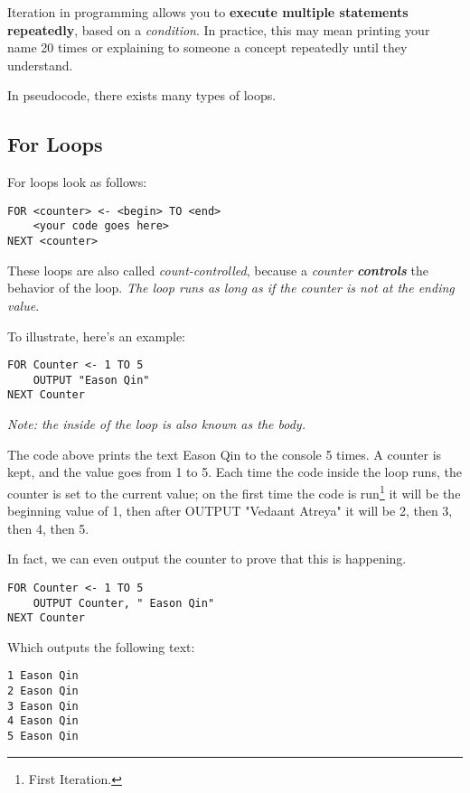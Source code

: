 \documentclass[./main.tex]{subfiles}
\begin{document}
Iteration in programming allows you to \textbf{execute multiple statements repeatedly}, based on a \emph{condition}. In practice, this may mean printing your name 20 times or explaining to someone a concept repeatedly until they understand.

In pseudocode, there exists many types of loops.

\subsection{For Loops}
\label{sec:for_loops}

For loops look as follows:

\begin{verbatim}
FOR <counter> <- <begin> TO <end>
    <your code goes here>
NEXT <counter>
\end{verbatim}

These loops are also called \emph{count-controlled}, because a \emph{counter \textbf{controls}} the behavior of the loop. \emph{The loop runs as long as if the counter is not at the ending value}.

To illustrate, here's an example:

\begin{verbatim}
FOR Counter <- 1 TO 5
    OUTPUT "Eason Qin"
NEXT Counter
\end{verbatim}

\emph{Note: the inside of the loop is also known as the body.}

The code above prints the text {\ccmono Eason Qin} to the console 5 times. A counter is kept, and the value goes from 1 to 5. Each time the code inside the loop runs, the counter is set to the current value; on the first time the code is run\footnote{First Iteration.} it will be the beginning value of 1, then after {\ccmono OUTPUT "Vedaant Atreya"} it will be 2, then 3, then 4, then 5.

In fact, we can even output the counter to prove that this is happening.

\begin{verbatim}
FOR Counter <- 1 TO 5
    OUTPUT Counter, " Eason Qin"
NEXT Counter
\end{verbatim}

Which outputs the following text:

\begin{verbatim}
1 Eason Qin
2 Eason Qin
3 Eason Qin
4 Eason Qin
5 Eason Qin
\end{verbatim}
\end{document}
